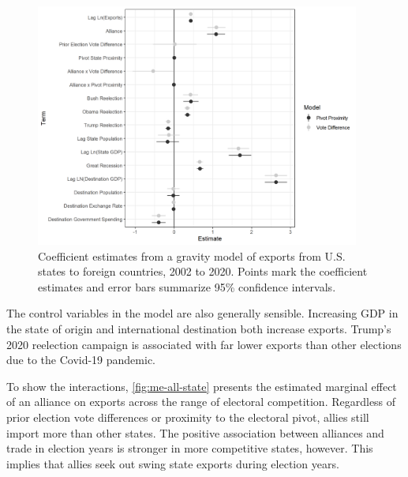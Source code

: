 \documentclass[12pt]{article}
\begin{document}
\begin{figure}[htpb]
	\centering
		\includegraphics[width=0.95\textwidth]{../figures/state-model-coefs.png}
	\caption{Coefficient estimates from a gravity model of exports from U.S. states to foreign countries, 2002 to 2020. Points mark the coefficient estimates and error bars summarize 95\% confidence intervals.}
	\label{fig:state-model-coefs}
\end{figure}


The control variables in the model are also generally sensible. 
Increasing GDP in the state of origin and international destination both increase exports. 
Trump's 2020 reelection campaign is associated with far lower exports than other elections due to the Covid-19 pandemic. 


To show the interactions, \autoref{fig:me-all-state} presents the estimated marginal effect of an alliance on exports across the range of electoral competition. 
Regardless of prior election vote differences or proximity to the electoral pivot, allies still import more than other states.
The positive association between alliances and trade in election years is stronger in more competitive states, however. 
This implies that allies seek out swing state exports during election years. 
\end{document}
